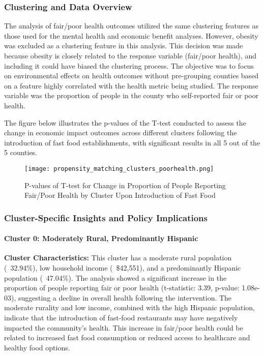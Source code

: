 \documentclass[letterpaper, 11pt]{report}
\begin{document}
\subsubsection{Clustering and Data Overview}
The analysis of fair/poor health outcomes utilized the same clustering features as those used for the mental health and economic benefit analyses. However, obesity was excluded as a clustering feature in this analysis. This decision was made because obesity is closely related to the response variable (fair/poor health), and including it could have biased the clustering process. The objective was to focus on environmental effects on health outcomes without pre-grouping counties based on a feature highly correlated with the health metric being studied. The response variable was the proportion of people in the county who self-reported fair or poor health.

\noindent The figure below illustrates the p-values of the T-test conducted to assess the change in economic impact outcomes across different clusters following the introduction of fast food establishments, with significant results in all 5 out of the 5 counties.

\begin{figure}[h!]
    \centering
    \texttt{[image: propensity\_matching\_clusters\_poorhealth.png]}
    \caption{P-values of T-test for Change in Proportion of People Reporting Fair/Poor Health by Cluster Upon Introduction of Fast Food}
    \label{fig:mental_health_pvalues}
\end{figure}

\newpage
\subsubsection{Cluster-Specific Insights and Policy Implications}
\paragraph{Cluster 0: Moderately Rural, Predominantly Hispanic}
\textbf{Cluster Characteristics:} This cluster has a moderate rural population (~32.94\%), low household income (~\$42,551), and a predominantly Hispanic population (~47.04\%). The analysis showed a significant increase in the proportion of people reporting fair or poor health (t-statistic: 3.39, p-value: 1.08e-03), suggesting a decline in overall health following the intervention. The moderate rurality and low income, combined with the high Hispanic population, indicate that the introduction of fast-food restaurants may have negatively impacted the community’s health. This increase in fair/poor health could be related to increased fast food consumption or reduced access to healthcare and healthy food options.
\end{document}
